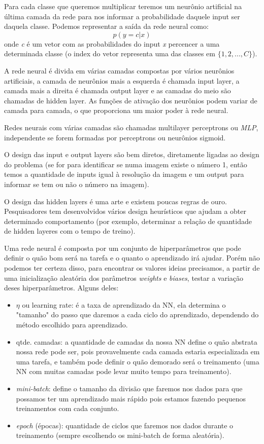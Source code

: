 \documentclass[11pt,a4paper,leqno]{article}
\begin{document}
Para cada classe que queremos multiplicar teremos um neurônio artificial na última camada da rede para nos informar a probabilidade daquele input ser daquela classe.
Podemos representar a saída da rede neural como:
\[
	p(y = c | x)
\]
onde \emph{c} é um vetor com as probabilidades do input \emph{x} percencer a uma determinada classe (o index do vetor representa uma das classes em $\{ 1, 2, ..., C \}$).

A rede neural é divida em várias camadas compostas por vários neurônios artificiais, a camada de neurônios mais a esquerda é chamada input layer, a camada mais a direita é chamada output layer e as camadas do meio são chamadas de hidden layer.
As funções de ativação dos neurônios podem variar de camada para camada, o que proporciona um maior poder à rede neural.

Redes neurais com várias camadas são chamadas multilayer perceptrons ou \emph{MLP}, independente se forem formadas por perceptrons ou neurônios sigmoid.

O design das input e output layers são bem diretos, diretamente ligadas ao design do problema (se for para identificar se numa imagem existe o número 1, então temos a quantidade de inputs igual à resolução da imagem e um output para informar se tem ou não o número na imagem).
	
O design das hidden layers é uma arte e existem poucas regras de ouro. Pesquisadores tem desenvolvidos vários design heurísticos que ajudam a obter determinado comportamento (por exemplo, determinar a relação de quantidade de hidden layeres com o tempo de treino).

Uma rede neural é composta por um conjunto de hiperparâmetros que pode definir o quão bom será na tarefa e o quanto o aprendizado irá ajudar. Porém não podemos ter certeza disso, para encontrar os valores ideias precisamos, a partir de uma inicialização aleatória dos parâmetros \emph{weights} e \emph{biases}, testar a variação deses hiperparâmetros.
Alguns deles:
\begin{itemize}
\item $\eta$ ou learning rate: é a taxa de aprendizado da NN, ela determina o "tamanho" do passo que daremos a cada ciclo do aprendizado, dependendo do método escolhido para aprendizado.
\item qtde. camadas: a quantidade de camadas da nossa NN define o quão abstrata nossa rede pode ser, pois provavelmente cada camada estaria especializada em uma tarefa, e também pode definir o quão demorado será o treinamento (uma NN com muitas camadas pode levar muito tempo para treinamento).
\item \emph{mini-batch}: define o tamanho da divisão que faremos nos dados para que possamos ter um aprendizado mais rápido pois estamos fazendo pequenos treinamentos com cada conjunto.
\item \emph{epoch} (épocas): quantidade de ciclos que faremos nos dados durante o treinamento (sempre escolhendo os mini-batch de forma aleatória).
\end{itemize}
\end{document}

